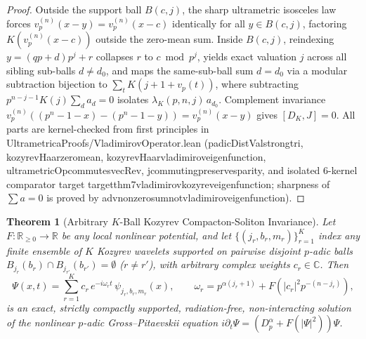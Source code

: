 \documentclass[11pt,a4paper]{article}
\numberwithin{equation}{section}
\theoremstyle{plain}
\newtheorem{theorem}{Theorem}[section]
\theoremstyle{definition}
\theoremstyle{remark}
\newcommand{\R}{\mathbb{R}}
\newcommand{\C}{\mathbb{C}}
\newcommand{\Dp}{D_p^\alpha}
\newcommand{\code}[1]{{\ttfamily\footnotesize\def\_{\textunderscore\penalty0\hskip0pt}#1}}
\begin{document}
\begin{proof}
Outside the support ball $B(c, j)$, the sharp ultrametric isosceles law forces $v_p^{(n)}(x - y) = v_p^{(n)}(x - c)$ identically for all $y \in B(c, j)$, factoring $K(v_p^{(n)}(x-c))$ outside the zero-mean sum. Inside $B(c, j)$, reindexing $y = (q p + d)p^j + r$ collapses $r$ to $c \bmod p^j$, yields exact valuation $j$ across all sibling sub-balls $d \ne d_0$, and maps the same-sub-ball sum $d = d_0$ via a modular subtraction bijection to $\sum_t K(j + 1 + v_p(t))$, where subtracting $p^{n-j-1} K(j)\sum_d a_d = 0$ isolates $\lambda_K(p,n,j)\,a_{d_0}$. Complement invariance $v_p^{(n)}((p^n-1-x)-(p^n-1-y)) = v_p^{(n)}(x-y)$ gives $[D_K, J] = 0$. All parts are kernel-checked from first principles in \code{UltrametricaProofs/\allowbreak VladimirovOperator.lean} (\code{padicDistVal\_\allowbreak strong\_\allowbreak tri}, \code{kozyrevHaar\_\allowbreak zero\_\allowbreak mean}, \code{kozyrevHaar\_\allowbreak vladimirov\_\allowbreak eigenfunction}, \code{ultrametricOp\_\allowbreak commutes\_\allowbreak vecRev}, \code{j\_\allowbreak commuting\_\allowbreak preserves\_\allowbreak parity}, and isolated 6-kernel comparator target \code{target\_\allowbreak thm7\_\allowbreak vladimirov\_\allowbreak kozyrev\_\allowbreak eigenfunction}; sharpness of $\sum a = 0$ is proved by \code{adv\_\allowbreak nonzerosum\_\allowbreak not\_\allowbreak vladimirov\_\allowbreak eigenfunction}).
\end{proof}

\begin{theorem}[Arbitrary $K$-Ball Kozyrev Compacton-Soliton Invariance]
\label{thm:soliton}
Let $F : \R_{\ge 0} \to \R$ be any local nonlinear potential, and let $\{(j_r, b_r, m_r)\}_{r=1}^K$ index any finite ensemble of $K$ Kozyrev wavelets supported on pairwise disjoint $p$-adic balls $B_{j_r}(b_r) \cap B_{j_{r'}}(b_{r'}) = \emptyset$ ($r \ne r'$), with arbitrary complex weights $c_r \in \C$. Then
\begin{equation}
  \Psi(x, t) = \sum_{r=1}^K c_r \, e^{-i \omega_r t} \, \psi_{j_r, b_r, m_r}(x), \qquad
  \omega_r = p^{\alpha(j_r + 1)} + F\!\left(|c_r|^2 p^{-(n - j_r)}\right),
  \label{eq:multisoliton}
\end{equation}
is an exact, strictly compactly supported, radiation-free, non-interacting solution of the nonlinear $p$-adic Gross--Pitaevskii equation $i\partial_t \Psi = (\Dp + F(|\Psi|^2))\Psi$.
\end{theorem}
\end{document}
